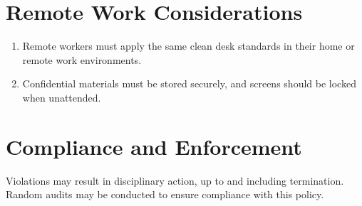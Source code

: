 \section{Remote Work Considerations}
\begin{enumerate}
    \item Remote workers must apply the same clean desk standards in their home or remote work environments.
    \item Confidential materials must be stored securely, and screens should be locked when unattended.
\end{enumerate}
\section{Compliance and Enforcement}
Violations may result in disciplinary action, up to and including termination. Random audits may be conducted to ensure compliance with this policy.
    
    